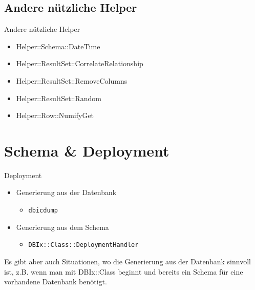 \subsection{Andere nützliche Helper}
\begin{frame}{Andere nützliche Helper}
\begin{itemize}
\item Helper::Schema::DateTime
\item Helper::ResultSet::CorrelateRelationship
\item Helper::ResultSet::RemoveColumns
\item Helper::ResultSet::Random
\item Helper::Row::NumifyGet
\end{itemize}
\end{frame}


\section{Schema \& Deployment}

\begin{frame}[fragile]{Deployment}
\begin{itemize}
\item Generierung aus der Datenbank
\begin{itemize}
\item \verb|dbicdump|
\end{itemize}
\item Generierung aus dem Schema
\begin{itemize}
\item \verb|DBIx::Class::DeploymentHandler|
\end{itemize}
\end{itemize}
\end{frame}

Es gibt aber auch Situationen, wo die
Generierung aus der Datenbank sinnvoll ist,
z.B. wenn man mit DBIx::Class beginnt und
bereits ein Schema für eine vorhandene
Datenbank benötigt.


